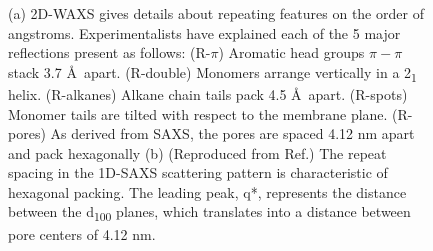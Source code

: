 \documentclass[journal=jpcbfk,manuscript=article]{achemso}
\begin{document}
\begin{figure}[!htb]
\begin{subfigure}[t]{0.405\linewidth}
                \caption{}\label{fig:SAXS}
        \end{subfigure}
	\caption{(a) 2D-WAXS gives details about repeating features on the
		order of angstroms. Experimentalists have explained each of the 5 major
		reflections present as follows: (R-$\pi$) Aromatic head groups $\pi-\pi$ stack
		3.7 \AA~apart. (R-double) Monomers arrange vertically in a 2\textsubscript{1}
		helix. (R-alkanes) Alkane chain tails pack 4.5 \AA~apart. (R-spots) Monomer
		tails are tilted with respect to the membrane plane. (R-pores) As derived from
		SAXS, the pores are spaced 4.12 nm apart and pack hexagonally (b) (Reproduced
		from Ref.) The repeat spacing in the 1D-SAXS
		scattering pattern is characteristic of hexagonal packing. The leading peak,
		q*, represents the distance between the d\textsubscript{100} planes, which translates 
                into a distance between pore centers of 4.12 nm.} 
	\label{fig:SWAXS}
 \end{figure}
  
\end{document}
